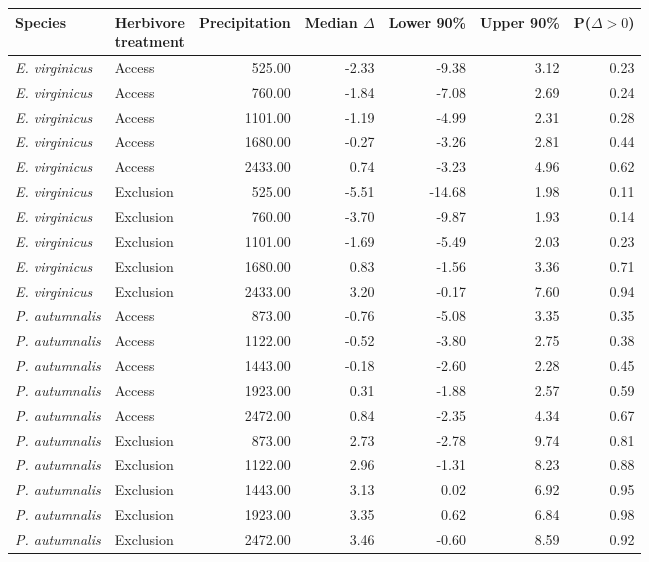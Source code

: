 \begin{tabular}{llrrrrr}
  \hline
Species & \makecell{Herbivore \\ treatment} & Precipitation & Median $\Delta$ & Lower 90\% & Upper 90\% & P($\Delta>0$) \\ 
  \hline
\textit{E. virginicus} & Access & 525.00 & -2.33 & -9.38 & 3.12 & 0.23 \\ 
  \textit{E. virginicus} & Access & 760.00 & -1.84 & -7.08 & 2.69 & 0.24 \\ 
  \textit{E. virginicus} & Access & 1101.00 & -1.19 & -4.99 & 2.31 & 0.28 \\ 
  \textit{E. virginicus} & Access & 1680.00 & -0.27 & -3.26 & 2.81 & 0.44 \\ 
  \textit{E. virginicus} & Access & 2433.00 & 0.74 & -3.23 & 4.96 & 0.62 \\ 
  \textit{E. virginicus} & Exclusion & 525.00 & -5.51 & -14.68 & 1.98 & 0.11 \\ 
  \textit{E. virginicus} & Exclusion & 760.00 & -3.70 & -9.87 & 1.93 & 0.14 \\ 
  \textit{E. virginicus} & Exclusion & 1101.00 & -1.69 & -5.49 & 2.03 & 0.23 \\ 
  \textit{E. virginicus} & Exclusion & 1680.00 & 0.83 & -1.56 & 3.36 & 0.71 \\ 
  \textit{E. virginicus} & Exclusion & 2433.00 & 3.20 & -0.17 & 7.60 & 0.94 \\ 
  \textit{P. autumnalis} & Access & 873.00 & -0.76 & -5.08 & 3.35 & 0.35 \\ 
  \textit{P. autumnalis} & Access & 1122.00 & -0.52 & -3.80 & 2.75 & 0.38 \\ 
  \textit{P. autumnalis} & Access & 1443.00 & -0.18 & -2.60 & 2.28 & 0.45 \\ 
  \textit{P. autumnalis} & Access & 1923.00 & 0.31 & -1.88 & 2.57 & 0.59 \\ 
  \textit{P. autumnalis} & Access & 2472.00 & 0.84 & -2.35 & 4.34 & 0.67 \\ 
  \textit{P. autumnalis} & Exclusion & 873.00 & 2.73 & -2.78 & 9.74 & 0.81 \\ 
  \textit{P. autumnalis} & Exclusion & 1122.00 & 2.96 & -1.31 & 8.23 & 0.88 \\ 
  \textit{P. autumnalis} & Exclusion & 1443.00 & 3.13 & 0.02 & 6.92 & 0.95 \\ 
  \textit{P. autumnalis} & Exclusion & 1923.00 & 3.35 & 0.62 & 6.84 & 0.98 \\ 
  \textit{P. autumnalis} & Exclusion & 2472.00 & 3.46 & -0.60 & 8.59 & 0.92 \\ 
   \hline
\end{tabular}
